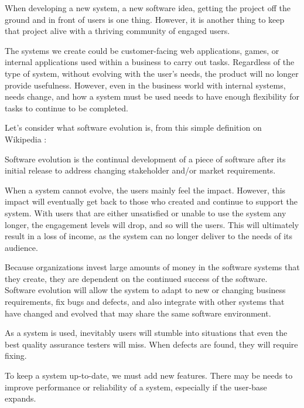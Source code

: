 \documentclass[12pt,conference]{IEEEtran}
\begin{document}

When developing a new system, a new software idea, getting the project off the ground and in front of users is one thing. However, it is another thing to keep that project alive with a thriving community of engaged users.

The systems we create could be customer-facing web applications, games, or internal applications used within a business to carry out tasks. Regardless of the type of system, without evolving with the user's needs, the product will no longer provide usefulness. However, even in the business world with internal systems, needs change, and how a system must be used needs to have enough flexibility for tasks to continue to be completed.

Let's consider what software evolution is, from this simple definition on Wikipedia \cite{wiki:software-evolution}:

\begin{displayquote}
Software evolution is the continual development of a piece of software after its initial release to address changing stakeholder and/or market requirements.
\end{displayquote}


When a system cannot evolve, the users mainly feel the impact. However, this impact will eventually get back to those who created and continue to support the system. With users that are either unsatisfied or unable to use the system any longer, the engagement levels will drop, and so will the users. This will ultimately result in a loss of income, as the system can no longer deliver to the needs of its audience.

Because organizations invest large amounts of money in the software systems that they create, they are dependent on the continued success of the software. Software evolution will allow the system to adapt to new or changing business requirements, fix bugs and defects, and also integrate with other systems that have changed and evolved that may share the same software environment.

As a system is used, inevitably users will stumble into situations that even the best quality assurance testers will miss. When defects are found, they will require fixing. 

To keep a system up-to-date, we must add new features. There may be needs to improve performance or reliability of a system, especially if the user-base expands.
\end{document}
